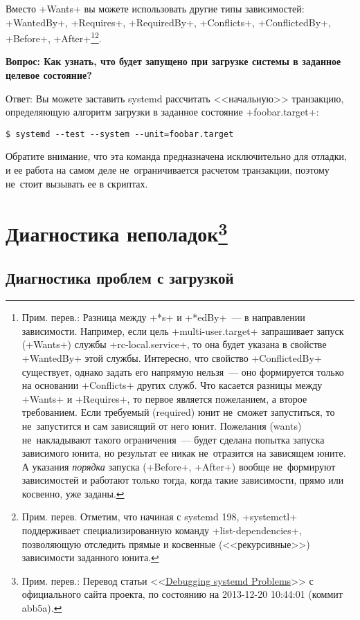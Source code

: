 \documentclass[10pt,oneside,a4paper]{article}
\newcommand{\sfnote}[1]{\texorpdfstring{\protect\footnote%
	{Прим. перев.: #1}}{}}
\newcommand{\qna}[1]{\medskip\par\textbf{Вопрос: #1}\nopagebreak\par Ответ:}
\begin{document}
Вместо +Wants+ вы можете использовать другие типы зависимостей: +WantedBy+, 
+Requires+, +RequiredBy+, +Conflicts+, +ConflictedBy+, +Before+,
+After+\footnote{\label{ftn:wants}Прим. перев.: Разница между +*s+ и +*edBy+~---
в направлении зависимости. Например, если цель +multi-user.target+ запрашивает
запуск (+Wants+) службы +rc-local.service+, то она будет
указана в свойстве +WantedBy+ этой службы. Интересно, что свойство
+ConflictedBy+ существует, однако задать его напрямую нельзя~--- оно
формируется только на основании +Conflicts+ других служб. Что касается
разницы между +Wants+ и +Requires+, то первое является пожеланием, а второе
требованием. Если требуемый (required) юнит не~сможет запуститься, то 
не~запустится и сам зависящий от него юнит. Пожелания (wants) не~накладывают
такого ограничения~--- будет сделана попытка запуска зависимого юнита, но
результат ее никак не~отразится на зависящем юните. А указания \emph{порядка}
запуска (+Before+, +After+) вообще не~формируют зависимостей и работают только
тогда, когда такие зависимости, прямо или косвенно, уже заданы.}\footnote{Прим.
перев. Отметим, что начиная с systemd 198, +systemctl+ поддерживает
специализированную команду +list-dependencies+, позволяющую отследить прямые и
косвенные (<<рекурсивные>>) зависимости заданного юнита.}.

\qna{Как узнать, что будет запущено при загрузке системы в заданное целевое
состояние?}
Вы можете заставить systemd рассчитать <<начальную>> транзакцию, определяющую
алгоритм загрузки в заданное состояние +foobar.target+:
\begin{Verbatim}
$ systemd --test --system --unit=foobar.target
\end{Verbatim}

Обратите внимание, что эта команда предназначена исключительно для отладки, и ее
работа на самом деле не~ограничивается расчетом транзакции, поэтому не~стоит
вызывать ее в скриптах.

\section{Диагностика неполадок\sfnote{Перевод статьи
<<\href{http://freedesktop.org/wiki/Software/systemd/Debugging}{Debugging
systemd Problems}>> с официального сайта проекта, по состоянию на 2013-12-20
10:44:01 (коммит abb5a).}}

\subsection{Диагностика проблем с загрузкой}
\end{document}
